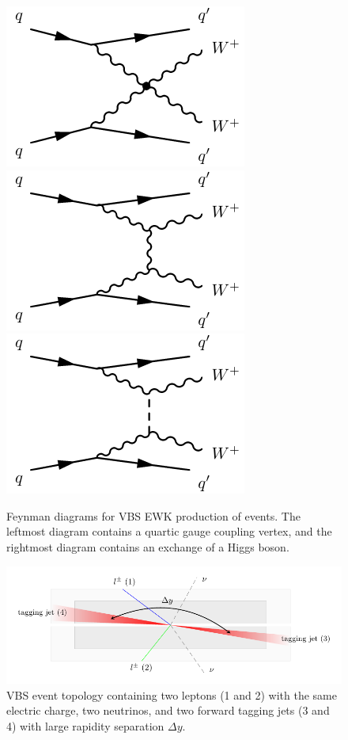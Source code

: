 \begin{figure}[htbp]
  \centering
  \includegraphics[width=.32\textwidth]{figs/ssww_13tev/diagrams/vbs1}
  \includegraphics[width=.32\textwidth]{figs/ssww_13tev/diagrams/vbs2}
  \includegraphics[width=.32\textwidth]{figs/ssww_13tev/diagrams/vbs3}
  \caption{Feynman diagrams for VBS EWK production of \ssww events. The leftmost diagram contains a quartic gauge coupling vertex, and the rightmost diagram contains an exchange of a Higgs boson. }
  \label{fig:ssww13tev_diagrams_vbs_ssww}
\end{figure}

\begin{figure}[htbp]
  \centering
  \includegraphics[width=.95\textwidth]{figs/ssww_13tev/introduction/vbs_event_topology}
  \caption{\ssww VBS event topology containing two leptons (1 and 2) with the same electric charge, two neutrinos, and two forward tagging jets (3 and 4) with large rapidity separation $\Delta y$.}
  \label{fig:ssww13tev_event_topology}
\end{figure}


